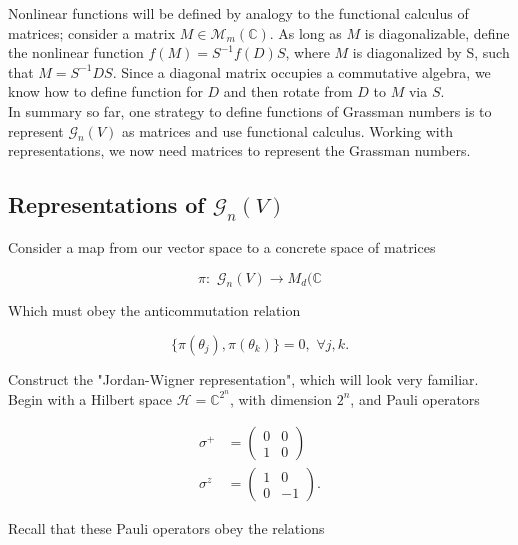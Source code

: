 \noindent Nonlinear functions will be defined by analogy to the functional calculus of matrices; consider a matrix $M \in \mathcal{M}_m (\mathbb{C})$. As long as $M$ is diagonalizable, define the nonlinear function $f(M) = S^{-1} f(D) S$, where $M$ is diagonalized by S, such that $M = S^{-1} D S$. Since a diagonal matrix occupies a commutative algebra, we know how to define function for $D$ and then rotate from $D$ to $M$ via $S$. \\

\noindent In summary so far, one strategy to define functions of Grassman numbers is to represent $\mathcal{G}_n (V)$ as matrices and use functional calculus. Working with representations, we now need matrices to represent the Grassman numbers.

\subsection*{Representations of $\mathcal{G}_n (V)$}

\noindent Consider a map from our vector space to a concrete space of matrices

\begin{equation}
\pi : \,\, \mathcal{G}_n (V) \rightarrow M_d (\mathbb{C}
\end{equation}

\noindent Which must obey the anticommutation relation

\begin{equation}
\{ \pi (\theta_j), \pi (\theta_k) \} = 0, \,\, \forall j,k .
\end{equation}

\noindent Construct the "Jordan-Wigner representation", which will look very familiar. Begin with a Hilbert space $\mathcal{H} = \mathbb{C}^{2^n}$, with dimension $2^n$, and Pauli operators 

\begin{align}
\sigma^+ &= \left( \begin{matrix} 0 & 0 \\ 1 & 0 \end{matrix}  \right) \\
\sigma^z &= \left( \begin{matrix} 1 & 0 \\ 0 & -1 \end{matrix} \right).
\end{align}

\noindent Recall that these Pauli operators obey the relations

